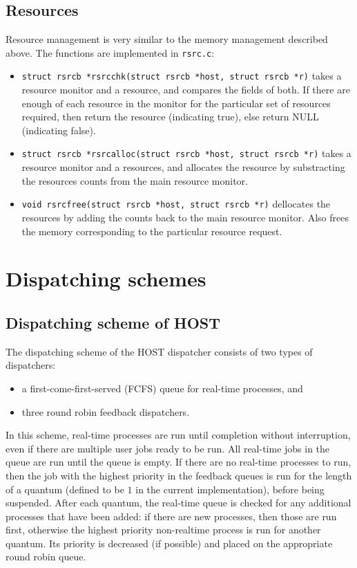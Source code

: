 \documentclass[12pt]{article}
\begin{document}
\subsection{Resources}
Resource management is very similar to the memory management described above.
The functions are implemented in \texttt{rsrc.c}:
\begin{itemize}
\item \texttt{struct rsrcb *rsrcchk(struct rsrcb *host, struct rsrcb *r)}
takes a resource monitor and a resource, and compares the fields of both. If
there are enough of each resource in the monitor for the particular set of
resources required, then return the resource (indicating true), else return
NULL (indicating false).
\item \texttt{struct rsrcb *rsrcalloc(struct rsrcb *host, struct rsrcb *r)}
takes a resource monitor and a resources, and allocates the resource by
substracting the resources counts from the main resource monitor.
\item \texttt{void rsrcfree(struct rsrcb *host, struct rsrcb *r)} dellocates
the resources by adding the counts back to the main resource monitor. Also
frees the memory corresponding to the particular resource request.
\end{itemize}

\section{Dispatching schemes}

\subsection{Dispatching scheme of HOST}
The dispatching scheme of the HOST dispatcher consists of two types of 
dispatchers:
\begin{itemize}
\item a first-come-first-served (FCFS) queue for real-time processes, and
\item three round robin feedback dispatchers.
\end{itemize}
In this scheme, real-time processes are run until completion without
interruption, even if there are multiple user jobs ready to be run. All
real-time jobs in the queue are run until the queue is empty. If there
are no real-time processes to run, then the job with the highest priority in
the feedback queues is run for the length of a quantum (defined to be $1$ in
the current implementation), before being suspended. After each quantum, the
real-time queue is checked for any additional processes that have been added:
if there are new processes, then those are run first, otherwise the highest
priority non-realtime process is run for another quantum. Its priority is
decreased (if possible) and placed on the appropriate round robin queue.
\end{document}

